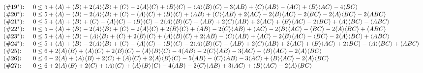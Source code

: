 \begin{align*}
{\begin{array}{ll}
 \text{($\#$} 19^* \text{):  } & 0\leq 5+\expec{A}+\expec{B}+2 \expec{A} \expec{B}+\expec{C}-2 \expec{A} \expec{C}+\expec{B}
   \expec{C}-\expec{A} \expec{B} \expec{C}+3 \expec{AB}+\expec{C} \expec{AB}-\expec{AC}+\expec{B} \expec{AC}-4 \expec{BC} \\
 \text{($\#$} 20^* \text{):  } & 0\leq 5+\expec{A}-\expec{B}-2 \expec{A} \expec{B}+\expec{C}-\expec{A} \expec{C}+\expec{B}
   \expec{C}+\expec{AB}+\expec{C} \expec{AB}+2 \expec{AC}-2 \expec{B} \expec{AC}-2 \expec{BC}-2 \expec{A} \expec{BC}-2 \expec{ABC} \\
 \text{($\#$} 21^* \text{):  } & 0\leq 5+\expec{A}+\expec{B}+\expec{C}-\expec{A} \expec{C}-\expec{B} \expec{C}-2 \expec{A} \expec{B}
   \expec{C}+\expec{AB}+2 \expec{C} \expec{AB}+2 \expec{AC}+\expec{B} \expec{AC}-2 \expec{BC}+\expec{A} \expec{BC}-\expec{ABC} \\
 \text{($\#$} 22^* \text{):  } & 0\leq 5-\expec{A}+\expec{B}-2 \expec{A} \expec{B}+\expec{C}-2 \expec{A} \expec{C}+2 \expec{B}
   \expec{C}+\expec{AB}-2 \expec{C} \expec{AB}+\expec{AC}-2 \expec{B} \expec{AC}-\expec{BC}-2 \expec{A} \expec{BC}+\expec{ABC} \\
 \text{($\#$} 23^* \text{):  } & 0\leq 5+\expec{A}+\expec{B}-\expec{A} \expec{B}+\expec{C}+2 \expec{B} \expec{C}+\expec{A} \expec{B}
   \expec{C}+2 \expec{AB}-\expec{C} \expec{AB}+\expec{AC}-2 \expec{B} \expec{AC}-\expec{BC}-2 \expec{A} \expec{BC}+\expec{ABC} \\
 \text{($\#$} 24^* \text{):  } & 0\leq 5+\expec{A}+\expec{B}-2 \expec{A} \expec{B}+\expec{C}-\expec{A} \expec{C}-\expec{B} \expec{C}-2
   \expec{A} \expec{B} \expec{C}-\expec{AB}+2 \expec{C} \expec{AB}+2 \expec{AC}+\expec{B} \expec{AC}+2 \expec{BC}-\expec{A}
   \expec{BC}+\expec{ABC} \\
 \text{($\#$} 25 \text{):  } & 0\leq 6+2 \expec{A} \expec{B}+\expec{A} \expec{C}+2 \expec{B} \expec{C}+\expec{A} \expec{B} \expec{C}-4
   \expec{AB}-2 \expec{C} \expec{AB}-3 \expec{AC}-\expec{B} \expec{AC}-2 \expec{A} \expec{BC} \\
 \text{($\#$} 26 \text{):  } & 0\leq 6-2 \expec{A}+\expec{A} \expec{B}+2 \expec{C}+\expec{A} \expec{C}+2 \expec{A} \expec{B}
   \expec{C}-5 \expec{AB}-\expec{C} \expec{AB}-3 \expec{AC}+\expec{B} \expec{AC}-2 \expec{A} \expec{BC} \\
 \text{($\#$} 27 \text{):  } & 0\leq 6+2 \expec{A} \expec{B}+2 \expec{C}+\expec{A} \expec{C}+\expec{A} \expec{B} \expec{C}-4
   \expec{AB}-2 \expec{C} \expec{AB}+3 \expec{AC}+\expec{B} \expec{AC}-2 \expec{A} \expec{BC} \\

\end{array}}
\end{align*}

